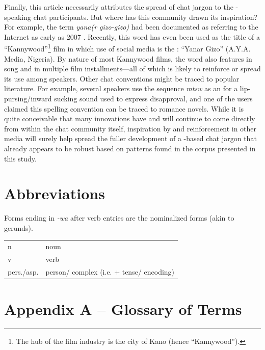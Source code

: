 \documentclass[output=paper
,newtxmath
,modfonts
,nonflat]{langsci/langscibook}
\begin{document}
Finally, this article necessarily attributes the spread of  chat jargon to the -speaking chat participants. But where has this community drawn its inspiration? For example, the term \textit{yana(r gizo-gizo)} had been documented as referring to the Internet as early as 2007 \citep{newman2007}. Recently, this word has even been used as the title of a “Kannywood”\footnote{The hub of the  film industry is the city of Kano (hence “Kannywood”).} film in which use of social media is the : “Yanar Gizo” (A.Y.A. Media, Nigeria). By nature of most Kannywood films, the word also features in song and in multiple film installments—all of which is likely to reinforce or spread its use among  speakers. Other chat conventions might be traced to popular  literature. For example, several speakers use the sequence \textit{mtsw} as an  for a lip-pursing/inward sucking sound used to express disapproval, and one of the users claimed this spelling convention can be traced to  romance novels. While it is quite conceivable that many innovations have and will continue to come directly from within the chat community itself, inspiration by and reinforcement in other media will surely help spread the fuller development of a -based chat jargon that already appears to be robust based on patterns found in the corpus presented in this study. 

\section*{Abbreviations}
Forms ending in \textit{{}-wa} after verb entries are the nominalized forms (akin to gerunds).

\noindent\begin{tabularx}{\textwidth}{@{}lQ@{}}
n & noun\\
v & verb\\ 
pers./asp.& person/ complex (i.e.  + tense/ encoding)
\end{tabularx}

\section*{Appendix A – Glossary of  Terms}
\end{document}
